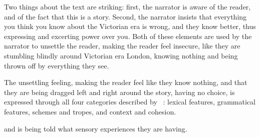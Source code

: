 Two things about the text are striking: first, the narrator is aware of the
reader, and of the fact that this is a story. Second, the narrator insists that
everything you think you know about the Victorian era is wrong, and they know
better, thus expressing and excerting power over you. Both of these elements are
used by the narrator to unsettle the reader, making the reader feel insecure,
like they are stumbling blindly around Victorian era London, knowing nothing and
being thrown off by everything they see.

The unsettling feeling, making the reader feel like they know nothing, and that
they are being dragged left and right around the story, having no choice, is
expressed through all four categories described by ~\textcite{leechshort}:
lexical features, grammatical features, schemes and tropes, and context and
cohesion.








and is being told what sensory experiences they are having.
